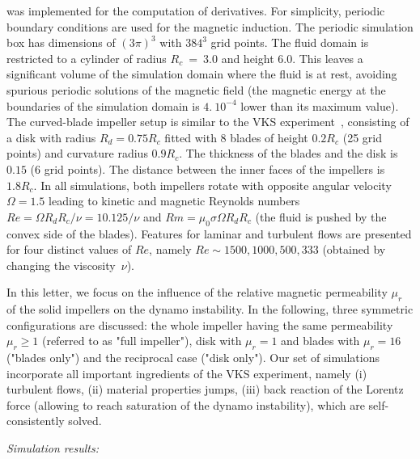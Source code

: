 \documentclass[aps,prl,twocolumn,showpacs,amsmath,amssymb]{revtex4-1}%
\begin{document}
was implemented for the computation of derivatives.
For simplicity, periodic boundary conditions are used for the magnetic induction.
The periodic simulation box has dimensions of $(3\pi)^3$ with $384^3$ grid points. 
The fluid domain is restricted to a cylinder of radius $R_c~=~3.0$ and height $6.0$.  
This leaves a significant volume of the simulation domain where the fluid is at rest, 
avoiding spurious periodic solutions of the magnetic field (the magnetic energy at the boundaries of the simulation domain is  $4.\ 10^{-4}$ lower than its maximum value).
The curved-blade impeller setup is similar to the VKS experiment~\cite{paper:ravelet:2005, paper:monchaux:2007}, consisting of a disk with radius $R_d = 0.75 R_c$ fitted with 8 blades of height $0.2 R_c$ (25 grid points) and curvature radius $0.9 R_c$. The thickness of the blades and the disk is $0.15$ 
(6 grid points). 
The distance between the inner faces of the impellers is $1.8 R_c$.  
In all simulations, both impellers rotate with opposite angular velocity $\Omega=1.5$ 
leading to kinetic and magnetic Reynolds numbers $Re=\Omega R_d R_c/\nu=10.125/\nu$ and $Rm=\mu_0 \sigma \Omega R_d R_c$  (the fluid is pushed by the convex side of the blades).
Features for laminar and turbulent flows are presented for four distinct values of $Re$, namely $Re \sim 1500, 1000, 500, 333$ (obtained by changing the viscosity~$\nu$).


In this letter, we focus on the influence of the relative magnetic permeability $\mu_r$ of the solid impellers on the dynamo instability. 
In the following, three symmetric configurations are discussed:
the whole impeller having the same permeability $\mu_r\geq 1$ (referred to as "full impeller"), 
disk with $\mu_r=1$ and blades with $\mu_r=16$ ("blades only") and the reciprocal case ("disk only"). Our set of simulations incorporate all important ingredients of the VKS experiment, namely (i) turbulent flows, (ii) material properties jumps, (iii) back reaction of the Lorentz force (allowing to reach saturation of the dynamo instability), which are self-consistently solved. 

\vspace{.2 cm}

\textit{Simulation results: }\label{sec:numresult}
\end{document}
